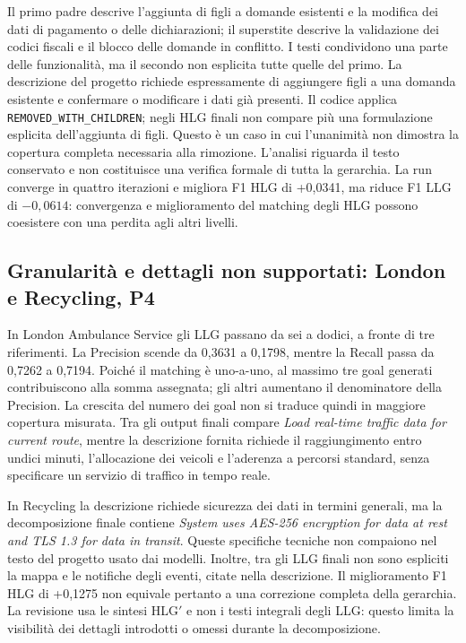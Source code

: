 Il primo padre descrive l'aggiunta di figli a domande esistenti e la
modifica dei dati di pagamento o delle dichiarazioni; il superstite
descrive la validazione dei codici fiscali e il blocco delle domande
in conflitto. I testi condividono una parte delle funzionalit\`a,
ma il secondo non esplicita tutte quelle del primo. La descrizione
del progetto richiede espressamente di aggiungere figli a una domanda
esistente e confermare o modificare i dati gi\`a presenti.
Il codice applica \texttt{REMOVED\_WITH\_CHILDREN}; negli HLG finali
non compare pi\`u una formulazione esplicita dell'aggiunta di figli.
Questo \`e un caso in cui l'unanimit\`a non dimostra la copertura
completa necessaria alla rimozione. L'analisi riguarda il testo
conservato e non costituisce una verifica formale di tutta la gerarchia.
La run converge in quattro iterazioni e migliora F1 HLG di +0,0341,
ma riduce F1 LLG di $-0{,}0614$: convergenza e miglioramento del
matching degli HLG possono coesistere con una perdita agli altri livelli.

\subsection{Granularit\`a e dettagli non supportati: London e Recycling, P4}
In London Ambulance Service gli LLG passano da sei a dodici, a fronte
di tre riferimenti. La Precision scende da 0,3631 a 0,1798, mentre
la Recall passa da 0,7262 a 0,7194. Poich\'e il matching \`e uno-a-uno,
al massimo tre goal generati contribuiscono alla somma assegnata;
gli altri aumentano il denominatore della Precision. La crescita
del numero dei goal non si traduce quindi in maggiore copertura
misurata. Tra gli output finali compare
\emph{Load real-time traffic data for current route}, mentre la
descrizione fornita richiede il raggiungimento entro undici minuti,
l'allocazione dei veicoli e l'aderenza a percorsi standard, senza
specificare un servizio di traffico in tempo reale.

In Recycling la descrizione richiede sicurezza dei dati in termini
generali, ma la decomposizione finale contiene
\emph{System uses AES-256 encryption for data at rest and TLS 1.3
for data in transit}. Queste specifiche tecniche non compaiono nel
testo del progetto usato dai modelli. Inoltre, tra gli LLG finali
non sono espliciti la mappa e le notifiche degli eventi, citate nella
descrizione. Il miglioramento F1 HLG di +0,1275 non equivale pertanto
a una correzione completa della gerarchia. La revisione usa le sintesi
HLG$'$ e non i testi integrali degli LLG: questo limita la visibilit\`a
dei dettagli introdotti o omessi durante la decomposizione.

